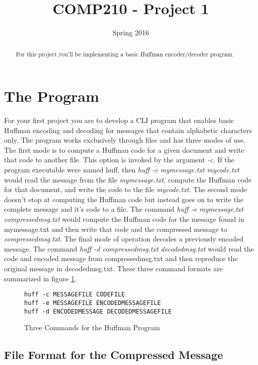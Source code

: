 \documentclass[]{tufte-handout}
\title{COMP210 - Project 1}
\author{}
\date{Spring 2016}
\begin{document}
\maketitle

\begin{abstract}
For this project you'll be implementing a basic Huffman encoder/decoder program. 
\end{abstract}

\section{The Program}

For your first project you are to develop a CLI program that enables basic Huffman encoding and decoding for messages that contain alphabetic characters only. The program works exclusively through files and has three modes of use.  The first mode is to compute a Huffman code for a given document and write that code to another file. This option is invoked by the argument \textit{-c}. If the program executable were named huff, then \textit{huff -c mymessage.txt mycode.txt} would read the message from the file \textit{mymessage.txt}, compute the Huffman code for that document, and write the code to the file \textit{mycode.txt}. The second mode doesn't stop at computing the Huffman code but instead goes on to write the complete message and it's code to a file. The command \textit{huff -e mymessage.txt compressedmsg.txt} would compute the Huffman code for the message found in mymessage.txt and then write that code and the compressed message to \textit{compressedmsg.txt}. The final mode of operation decodes a previously encoded message. The command \textit{huff -d compressedmsg.txt decodedmsg.txt} would read the code and encoded message from compressedmsg.txt and then reproduce the original message in decodedmsg.txt. These three command formats are summarized in figure \ref{fig:cmds}.
\begin{figure}
\begin{verbatim}
huff -c MESSAGEFILE CODEFILE
huff -e MESSAGEFILE ENCODEDMESSAGEFILE
huff -d ENCODEDMESSAGE DECODEDMESSAGEFILE
\end{verbatim}
\caption{Three Commands for the Huffman Program}
\label{fig:cmds}
\end{figure}

\subsection{File Format for the Compressed Message}
\end{document}
